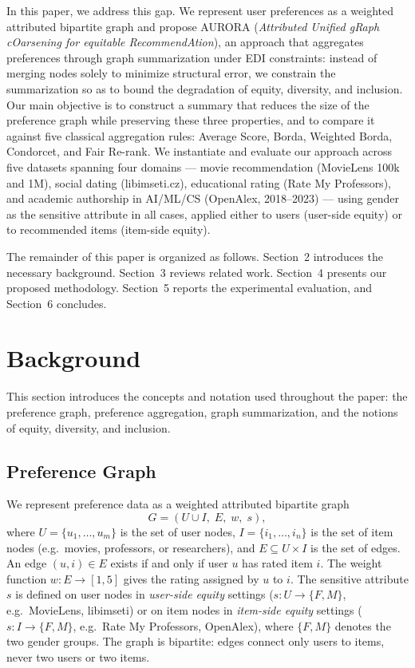 \documentclass[runningheads]{llncs}
\begin{document}
In this paper, we address this gap. We represent user preferences as a
weighted attributed bipartite graph and propose AURORA (\textit{Attributed Unified gRaph cOarsening
for equitable RecommendAtion}), an approach that aggregates
preferences through graph summarization under EDI constraints: instead of merging nodes solely
to minimize structural error, we constrain the summarization so as to bound
the degradation of equity, diversity, and inclusion. Our main objective is
to construct a summary that reduces the size of the preference graph while
preserving these three properties, and to compare it against five classical
aggregation rules: Average Score, Borda, Weighted Borda, Condorcet, and
Fair Re-rank. We instantiate and evaluate our approach across five datasets
spanning four domains --- movie recommendation (MovieLens 100k~\cite{harper2015movielens}
and 1M), social dating (libimseti.cz), educational rating (Rate My
Professors), and academic authorship in AI/ML/CS (OpenAlex, 2018--2023)
--- using gender as the sensitive attribute in all cases, applied either
to users (user-side equity) or to recommended items (item-side equity).

The remainder of this paper is organized as follows. Section~2 introduces
the necessary background. Section~3 reviews related work. Section~4 presents
our proposed methodology. Section~5 reports the experimental evaluation,
and Section~6 concludes.




\section{Background}
\label{sec:background}

This section introduces the concepts and notation used throughout the paper:
the preference graph, preference aggregation, graph summarization, and the
notions of equity, diversity, and inclusion.

\subsection{Preference Graph}

We represent preference data as a weighted attributed bipartite graph
\[
  G = (U \cup I,\; E,\; w,\; s),
\]
where $U = \{u_1, \ldots, u_m\}$ is the set of user nodes, $I = \{i_1,
\ldots, i_n\}$ is the set of item nodes (e.g.\ movies, professors, or
researchers), and $E \subseteq U \times I$ is the set of edges. An edge
$(u, i) \in E$ exists if and only if user $u$ has rated item $i$. The weight
function $w : E \rightarrow [1, 5]$ gives the rating assigned by $u$ to $i$.
The sensitive attribute $s$ is defined on user nodes in \emph{user-side
equity} settings ($s : U \rightarrow \{F, M\}$, e.g.\ MovieLens, libimseti)
or on item nodes in \emph{item-side equity} settings ($s : I \rightarrow
\{F, M\}$, e.g.\ Rate My Professors, OpenAlex), where $\{F, M\}$ denotes
the two gender groups. The graph is bipartite: edges connect only users to
items, never two users or two items.
\end{document}
